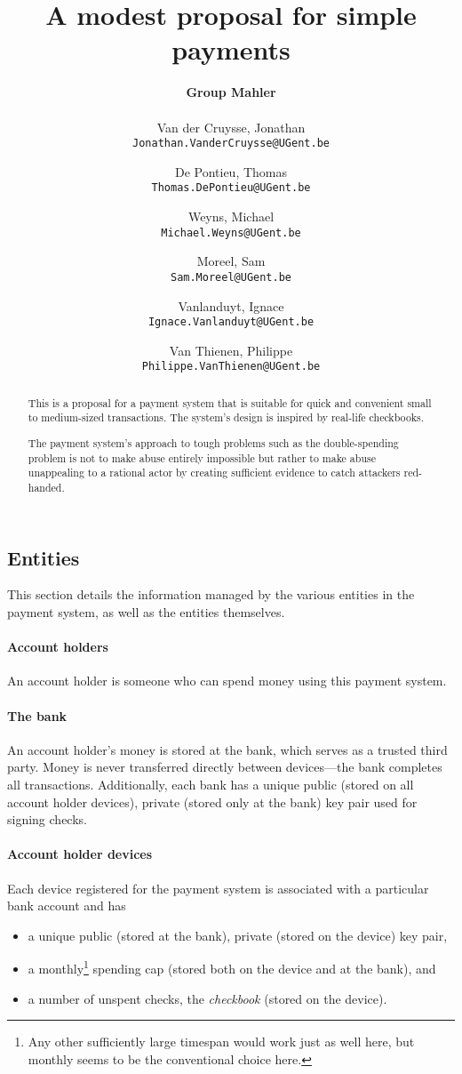 \documentclass[12pt,a4paper]{article}
\author{
\textbf{Group Mahler}\\~\\
  Van der Cruysse, Jonathan\\ \texttt{Jonathan.VanderCruysse@UGent.be}
  \and
  De Pontieu, Thomas\\ \texttt{Thomas.DePontieu@UGent.be}
  \and
 Weyns, Michael\\ \texttt{Michael.Weyns@UGent.be}
\and
Moreel, Sam\\ \texttt{Sam.Moreel@UGent.be}
\and
Vanlanduyt, Ignace\\ \texttt{Ignace.Vanlanduyt@UGent.be}
\and
Van Thienen, Philippe\\ \texttt{Philippe.VanThienen@UGent.be}
}
\title{A modest proposal for simple payments}
\begin{document}
	\maketitle
	
	\begin{abstract}
		This is a proposal for a payment system that is suitable for quick and convenient small to medium-sized transactions. The system's design is inspired by real-life checkbooks.
		
		The payment system's approach to tough problems such as the double-spending problem is not to make abuse entirely impossible but rather to make abuse unappealing to a rational actor by creating sufficient evidence to catch attackers red-handed.
	\end{abstract}

	\begin{multicols}{2}

	\section{Entities}
	\label{sec:entities}
	
	This section details the information managed by the various entities in the payment system, as well as the entities themselves.
	
	\paragraph{Account holders} An account holder is someone who can spend money using this payment system.
	
	\paragraph{The bank}
	
	An account holder's money is stored at the bank, which serves as a trusted third party. Money is never transferred directly between devices---the bank completes all transactions. Additionally, each bank has a unique public (stored on all account holder devices), private (stored only at the bank) key pair used for signing checks.
	
	\paragraph{Account holder devices}
	
	Each device registered for the payment system is associated with a particular bank account and has
	\begin{itemize}
		\item a unique public (stored at the bank), private (stored on the device) key pair,
		\item a monthly\footnote{Any other sufficiently large timespan would work just as well here, but monthly seems to be the conventional choice here.} spending cap (stored both on the device and at the bank), and
		\item a number of unspent checks, the \emph{checkbook} (stored on the device).
	\end{itemize}


\end{multicols}
\end{document}

